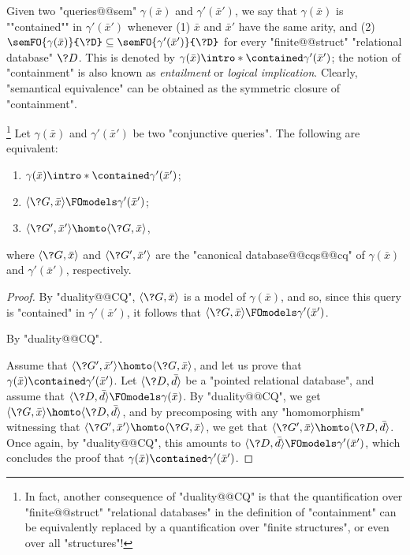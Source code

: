 Given two "queries@@sem" $\gamma(\bar x)$ and $\gamma'(\bar x')$,
we say that $\gamma(\bar x)$ is ""contained"" in $\gamma'(\bar x')$
whenever (1) $\bar x$ and $\bar x'$ have the same arity, and (2)
$\semFO{\gamma(\bar x)}{\?D} \subseteq \semFO{\gamma'(\bar x')}{\?D}$
for every "finite@@struct" "relational database" $\?D$. This is denoted by
$\gamma(\bar x) \intro*\contained \gamma'(\bar x')$; the notion
of "containment" is also known as \emph{entailment} or \emph{logical implication}.
Clearly, "semantical equivalence" can be obtained as the symmetric
closure of "containment".

\begin{proposition}
	\!\footnote{In fact, another consequence of "duality@@CQ" is that
	the quantification over "finite@@struct" "relational databases"
	in the definition of "containment" can be equivalently replaced
	by a quantification over "finite structures", or even over all "structures"!}
	\AP\label{prop:containment-hom}
	Let $\gamma(\bar x)$ and $\gamma'(\bar x')$ be two "conjunctive queries".
	The following are equivalent:
	\begin{enumerate}
		\item $\gamma(\bar x) \intro*\contained \gamma'(\bar x')$;
		\item $\tup{\?G, \bar x} \FOmodels \gamma'(\bar x')$;
		\item $\tup{\?G', \bar x'} \homto \tup{\?G, \bar x}$,
	\end{enumerate}
	where $\tup{\?G, \bar x}$ and $\tup{\?G', \bar x'}$ are the "canonical database@@cqs@@cq"
	of $\gamma(\bar x)$ and $\gamma'(\bar x')$, respectively.
\end{proposition}

\begin{proof}
	By "duality@@CQ", $\tup{\?G, \bar x}$ is a model of $\gamma(\bar x)$,
	and so, since this query is "contained" in $\gamma'(\bar x')$,
	it follows that $\tup{\?G, \bar x} \FOmodels \gamma'(\bar x')$.

	 By "duality@@CQ".

	 Assume that
	$\tup{\?G', \bar x'} \homto \tup{\?G, \bar x}$,
	and let us prove that $\gamma(\bar x) \contained \gamma'(\bar x')$.
	Let $\tup{\?D, \bar d}$ be a "pointed relational database",
	and assume that $\tup{\?D, \bar d} \FOmodels \gamma(\bar x)$.
	By "duality@@CQ", we get $\tup{\?G, \bar x} \homto \tup{\?D, \bar d}$,
	and by precomposing with any "homomorphism" witnessing
	that $\tup{\?G', \bar x'} \homto \tup{\?G, \bar x}$,
	we get that $\tup{\?G', \bar x} \homto \tup{\?D, \bar d}$.
	Once again, by "duality@@CQ", this amounts to $\tup{\?D, \bar d} \FOmodels \gamma'(\bar x')$,
	which concludes the proof that $\gamma(\bar x) \contained \gamma'(\bar x')$.
\end{proof}

